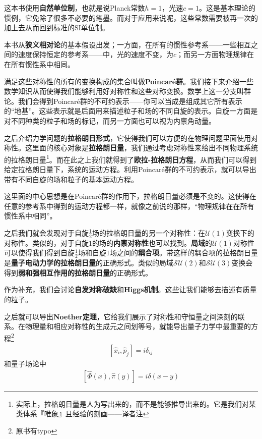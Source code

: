 这本书使用{\bfseries 自然单位制}，也就是说Planck常数$h = 1$，光速$c=1$。这是基本理论的惯例，它免除了很多不必要的笔墨。而对于应用来说呢，这些常数需要被再一次的加上去从而回到标准的SI单位制。

本书从{\bfseries 狭义相对论}的基本假设出发；一方面，在所有的惯性参考系——一些相互之间的速度保持恒定的参考系——中，光的速度不变，为$c$；而另一方面物理规律在在所有惯性系中相同。

满足这些对称性的所有的变换构成的集合叫做{\bfseries Poincaré群}。我们接下来介绍一些数学知识从而使得我们能够利用好对称性和这些对称变换。数学上这一分支叫群论。我们会得到Poincaré群的不可约表示——你可以当成是组成其它所有表示的“地基”。这些表示就是后面用来描述粒子和场的不同自旋的表示。自旋一方面是对不同种类的粒子和场的标记，而另一方面也可以视为内禀角动量。

之后介绍力学问题的{\bfseries 拉格朗日形式}，它使得我们可以方便的在物理问题里面使用对称性。这里面的核心对象是{\bfseries 拉格朗日量}，我们通过考虑对称性来给出不同物理系统的拉格朗日量\footnote{实际上，拉格朗日量是人为写出来的，而不是能够推导出来的。它是我们对某类体系『唯象』且经验的刻画——译者注}。而在此之上我们就得到了{\bfseries 欧拉-拉格朗日方程}，从而我们可以得到给定拉格朗日量下，系统的运动方程。利用Poincaré群的不可约表示，就可以导出带有不同自旋的场和粒子的基本运动方程。

这里面的中心思想是在Poincaré群的作用下，拉格朗日量必须是不变的。这使得在任意的参考系中得到的运动方程都一样，就像之前说的那样，“物理规律在在所有惯性系中相同”。

之后我们就会发现对于自旋$\tfrac{1}{2}$场的拉格朗日量的另一个对称性：在$\mathcal{U}(1)$变换下的对称性。类似的，对于自旋$1$的场的{\bfseries 内禀对称性}也可以找到。{\bfseries 局域}的$\mathcal{U}(1)$对称性可以使得我们得到自旋$\tfrac{1}{2}$场和自旋$1$场之间的{\bfseries 耦合项}。带这样的耦合项的拉格朗日量是{\bfseries 量子电动力学的拉格朗日量}的正确形式。类似的局域$\mathcal{SU}(2)$和$\mathcal{SU}(3)$变换会得到{\bfseries 弱和强相互作用的拉格朗日量}的正确形式。

作为补充，我们会讨论{\bfseries 自发对称破缺}和{\bfseries Higgs机制}。这些让我们能够去描述有质量的粒子。

之后就可以导出{\bfseries Noether定理}，它给我们展示了对称性和守恒量之间深刻的联系。在物理量和相应对称性的生成元之间划等号，就能导出量子力学中最重要的方程\footnote{原书有typo}
\begin{align}\label{eq1.1}
[\hat{x}_i,\hat{p}_j]=i\delta_{ij}
\end{align}
和量子场论中
\begin{align}\label{eq1.2}
[\hat{\Phi}(x),\hat{\pi}(y)]=i\delta(x-y)
\end{align}

